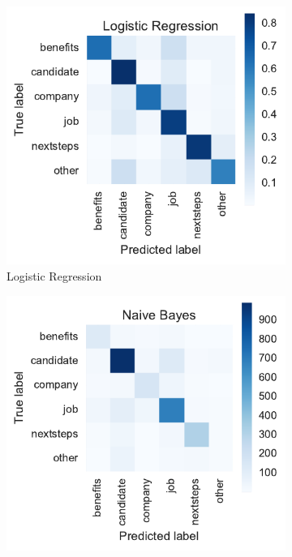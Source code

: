 \begin{figure}[h]
    \centering
    \begin{subfigure}[b]{0.32\textwidth}
        \includegraphics[width=\textwidth]{img/exp-vector-space-conf-matrix-ngram-logreg-normalized.pdf}
        \caption{Logistic Regression}
\label{fig:exp-vector-space-conf-matrix-ngram-logreg-normalized}
    \end{subfigure}
    \begin{subfigure}[b]{0.32\textwidth}
        \includegraphics[width=\textwidth]{img/exp-vector-space-conf-matrix-ngram-naivebayes-normalized.pdf}

\end{subfigure}
\end{figure}
